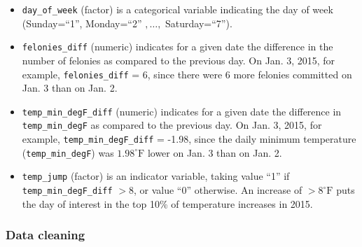 \documentclass[11pt,notitlepage]{article}
\newcommand{\degf}{^\circ\text{F}}
\begin{document}
\begin{itemize}
\item \texttt{day_of_week} (factor) is a categorical variable indicating the day of week (Sunday=``1'', Monday=``2'' $, \ldots, $ Saturday=``7''). 

\item \texttt{felonies_diff} (numeric) indicates for a given date the difference in the number of felonies as compared to the previous day. On Jan. 3, 2015, for example, \texttt{felonies_diff} = 6, since there were 6 more felonies committed on Jan. 3 than on Jan. 2.

\item \texttt{temp_min_degF_diff} (numeric) indicates for a given date the difference in \texttt{temp_min_degF} as compared to the previous day. On Jan. 3, 2015, for example, \texttt{temp_min_degF_diff} = -1.98, since the daily minimum temperature (\texttt{temp_min_degF}) was $1.98 \degf$ lower on Jan. 3 than on Jan. 2.

\item \texttt{temp_jump} (factor) is an indicator variable, taking value ``1'' if \texttt{temp_min_degF_diff} $> 8$, or value ``0'' otherwise. An increase of $> 8 \degf$ puts the day of interest in the top 10\% of temperature increases in 2015.

\end{itemize}




\subsubsection{Data cleaning}
\end{document}
